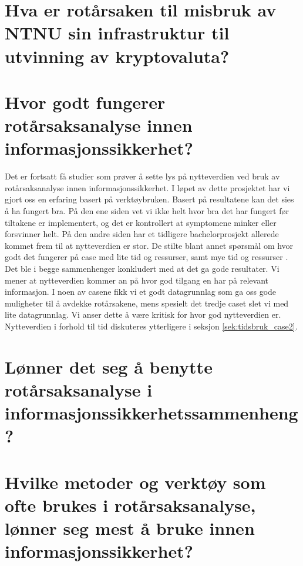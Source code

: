 \section{Hva er rotårsaken til misbruk av NTNU sin infrastruktur til utvinning av kryptovaluta?}



\section{Hvor godt fungerer rotårsaksanalyse innen informasjonssikkerhet?}
Det er fortsatt få studier som prøver å sette lys på nytteverdien ved bruk av rotårsaksanalyse innen informasjonssikkerhet. I løpet av dette prosjektet har vi gjort oss en erfaring basert på verktøybruken. Basert på resultatene kan det sies å ha fungert bra. På den ene siden vet vi ikke helt hvor bra det har fungert før tiltakene er implementert, og det er kontrollert at symptomene minker eller forsvinner helt. På den andre siden har et tidligere bachelorprosjekt allerede kommet frem til at nytteverdien er stor. De stilte blant annet spørsmål om hvor godt det fungerer på case med lite tid og ressurser, samt mye tid og ressurser \cite{RCARapport}. Det ble i begge sammenhenger konkludert med at det ga gode resultater. Vi mener at nytteverdien kommer an på hvor god tilgang en har på relevant informasjon. I noen av casene fikk vi et godt datagrunnlag som ga oss gode muligheter til å avdekke rotårsakene, mens spesielt det tredje caset slet vi med lite datagrunnlag. Vi anser dette å være kritisk for hvor god nytteverdien er. Nytteverdien i forhold til tid diskuteres ytterligere i seksjon \ref{sek:tidsbruk_case2}. 

\section{Lønner det seg å benytte rotårsaksanalyse i informasjonssikkerhetssammenheng?}


\section{Hvilke metoder og verktøy som ofte brukes i rotårsaksanalyse, lønner seg mest å bruke innen informasjonssikkerhet?}

